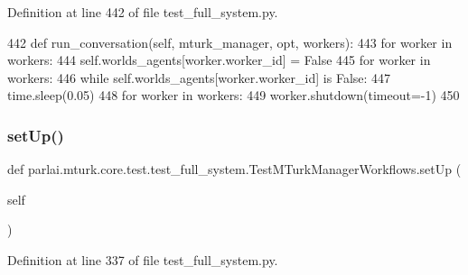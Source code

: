 Definition at line 442 of file test\+\_\+full\+\_\+system.\+py.


\begin{DoxyCode}
442     \textcolor{keyword}{def }run\_conversation(self, mturk\_manager, opt, workers):
443         \textcolor{keywordflow}{for} worker \textcolor{keywordflow}{in} workers:
444             self.worlds\_agents[worker.worker\_id] = \textcolor{keyword}{False}
445         \textcolor{keywordflow}{for} worker \textcolor{keywordflow}{in} workers:
446             \textcolor{keywordflow}{while} self.worlds\_agents[worker.worker\_id] \textcolor{keywordflow}{is} \textcolor{keyword}{False}:
447                 time.sleep(0.05)
448         \textcolor{keywordflow}{for} worker \textcolor{keywordflow}{in} workers:
449             worker.shutdown(timeout=-1)
450 
\end{DoxyCode}
\mbox{\label{classparlai_1_1mturk_1_1core_1_1test_1_1test__full__system_1_1TestMTurkManagerWorkflows_a62baf9564be3f57380e5ac503c1ccd3c}} 
\subsubsection{\texorpdfstring{set\+Up()}{setUp()}}
{\footnotesize\ttfamily def parlai.\+mturk.\+core.\+test.\+test\+\_\+full\+\_\+system.\+Test\+M\+Turk\+Manager\+Workflows.\+set\+Up (\begin{DoxyParamCaption}\item[{}]{self }\end{DoxyParamCaption})}



Definition at line 337 of file test\+\_\+full\+\_\+system.\+py.


